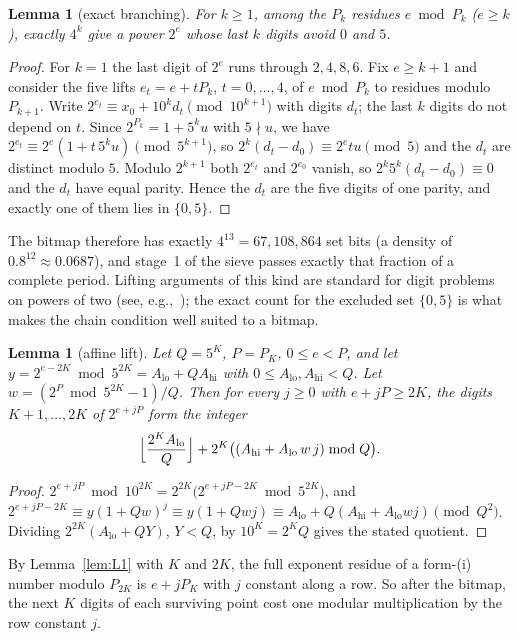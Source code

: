 \documentclass[11pt]{article}
\newtheorem{lemma}[theorem]{Lemma}
\theoremstyle{definition}
\begin{document}
\begin{lemma}[exact branching]\label{lem:L2}
For $k\ge1$, among the $P_k$ residues $e\bmod P_k$ ($e\ge k$), exactly $4^k$ give a power $2^e$ whose last $k$ digits avoid
$0$ and $5$.
\end{lemma}

\begin{proof}
For $k=1$ the last digit of $2^e$ runs through $2,4,8,6$. Fix $e\ge k+1$ and consider the five lifts $e_t=e+tP_k$,
$t=0,\dots,4$, of $e\bmod P_k$ to residues modulo $P_{k+1}$. Write $2^{e_t}\equiv x_0+10^k d_t\pmod{10^{k+1}}$ with
digits $d_t$; the last $k$ digits do not depend on $t$. Since $2^{P_k}=1+5^ku$ with $5\nmid u$, we have
$2^{e_t}\equiv 2^e(1+t\,5^ku)\pmod{5^{k+1}}$, so $2^k(d_t-d_0)\equiv 2^et u\pmod 5$ and the $d_t$ are distinct modulo
$5$. Modulo $2^{k+1}$ both $2^{e_t}$ and $2^{e_0}$ vanish, so $2^k5^k(d_t-d_0)\equiv0$ and the $d_t$ have equal parity.
Hence the $d_t$ are the five digits of one parity, and exactly one of them lies in $\{0,5\}$.
\end{proof}

The bitmap therefore has exactly $4^{13}=67{,}108{,}864$ set bits (a density of $0.8^{12}\approx0.0687$), and stage~1 of
the sieve passes exactly that fraction of a complete period. Lifting arguments of this kind are standard for digit
problems on powers of two (see, e.g.,~\cite{dumitru}); the exact count for the excluded set $\{0,5\}$ is what makes the
chain condition well suited to a bitmap.

\begin{lemma}[affine lift]\label{lem:L3}
Let $Q=5^K$, $P=P_K$, $0\le e<P$, and let $y=2^{e-2K}\bmod 5^{2K}=A_{\mathrm{lo}}+QA_{\mathrm{hi}}$ with
$0\le A_{\mathrm{lo}},A_{\mathrm{hi}}<Q$. Let $w=(2^{P}\bmod 5^{2K}-1)/Q$. Then for every $j\ge0$ with $e+jP\ge 2K$, the
digits $K+1,\dots,2K$ of $2^{e+jP}$ form the integer
\[ \Bigl\lfloor\frac{2^K A_{\mathrm{lo}}}{Q}\Bigr\rfloor+2^K\bigl((A_{\mathrm{hi}}+A_{\mathrm{lo}}\,w\,j)\bmod Q\bigr). \]
\end{lemma}

\begin{proof}
$2^{e+jP}\bmod 10^{2K}=2^{2K}\bigl(2^{e+jP-2K}\bmod 5^{2K}\bigr)$, and $2^{e+jP-2K}\equiv y(1+Qw)^j\equiv y(1+Qwj)\equiv
A_{\mathrm{lo}}+Q(A_{\mathrm{hi}}+A_{\mathrm{lo}}wj)\pmod{Q^2}$. Dividing $2^{2K}(A_{\mathrm{lo}}+QY)$, $Y<Q$, by $10^K=2^KQ$
gives the stated quotient.
\end{proof}

By Lemma~\ref{lem:L1} with $K$ and $2K$, the full exponent residue of a form-(i) number modulo $P_{2K}$ is $e+jP_K$ with
$j$ constant along a row. So after the bitmap, the next $K$ digits of each surviving point cost one modular
multiplication by the row constant $j$.
\end{document}
